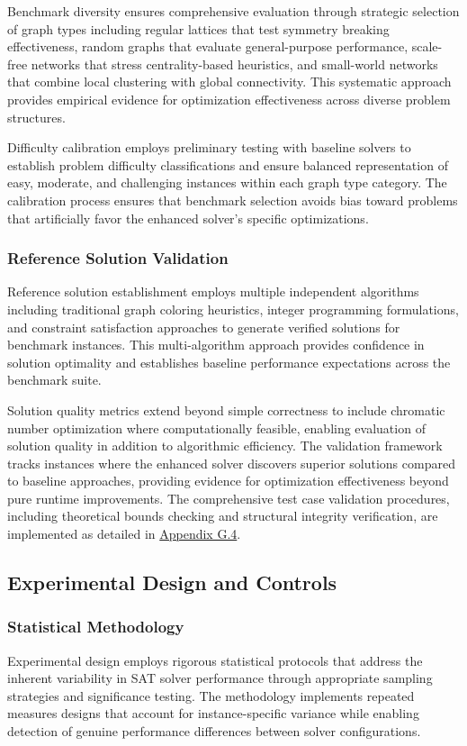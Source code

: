 Benchmark diversity ensures comprehensive evaluation through strategic selection of graph types including regular lattices that test symmetry breaking effectiveness, random graphs that evaluate general-purpose performance, scale-free networks that stress centrality-based heuristics, and small-world networks that combine local clustering with global connectivity. This systematic approach provides empirical evidence for optimization effectiveness across diverse problem structures.

Difficulty calibration employs preliminary testing with baseline solvers to establish problem difficulty classifications and ensure balanced representation of easy, moderate, and challenging instances within each graph type category. The calibration process ensures that benchmark selection avoids bias toward problems that artificially favor the enhanced solver's specific optimizations.

\subsubsection{Reference Solution Validation}
Reference solution establishment employs multiple independent algorithms including traditional graph coloring heuristics, integer programming formulations, and constraint satisfaction approaches to generate verified solutions for benchmark instances. This multi-algorithm approach provides confidence in solution optimality and establishes baseline performance expectations across the benchmark suite.

Solution quality metrics extend beyond simple correctness to include chromatic number optimization where computationally feasible, enabling evaluation of solution quality in addition to algorithmic efficiency. The validation framework tracks instances where the enhanced solver discovers superior solutions compared to baseline approaches, providing evidence for optimization effectiveness beyond pure runtime improvements. The comprehensive test case validation procedures, including theoretical bounds checking and structural integrity verification, are implemented as detailed in \hyperref[appendix:test-validation]{Appendix G.4}.

\subsection{Experimental Design and Controls}

\subsubsection{Statistical Methodology}
Experimental design employs rigorous statistical protocols that address the inherent variability in SAT solver performance through appropriate sampling strategies and significance testing. The methodology implements repeated measures designs that account for instance-specific variance while enabling detection of genuine performance differences between solver configurations.

